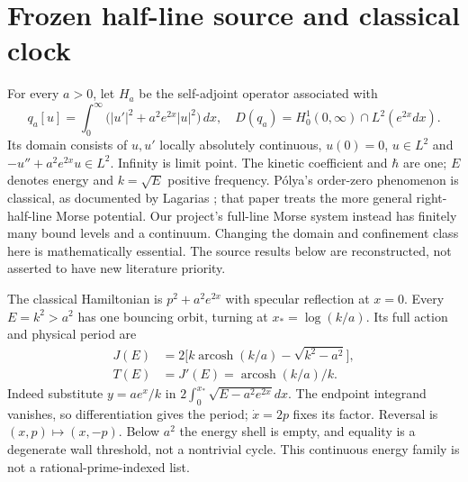 \documentclass[10pt]{article}
\begin{document}
\section{Frozen half-line source and classical clock}
For every $a>0$, let $H_a$ be the self-adjoint operator associated with
\[
 q_a[u]=\int_0^\infty\bigl(|u'|^2+a^2e^{2x}|u|^2\bigr)\,dx,
 \quad D(q_a)=H^1_0(0,\infty)\cap L^2(e^{2x}dx).
\]
Its domain consists of $u,u'$ locally absolutely continuous,
$u(0)=0$, $u\in L^2$ and $-u''+a^2e^{2x}u\in L^2$.
Infinity is limit point. The kinetic coefficient and $\hbar$ are one;
$E$ denotes energy and $k=\sqrt E$ positive frequency.
Pólya's order-zero phenomenon is classical, as documented by Lagarias
\cite{lagarias}; that paper treats the more general right-half-line Morse
potential. Our project's full-line Morse system instead has finitely many
bound levels and a continuum. Changing the domain and confinement class
here is mathematically essential. The source results below are reconstructed,
not asserted to have new literature priority.

The classical Hamiltonian is $p^2+a^2e^{2x}$ with specular reflection at
$x=0$. Every $E=k^2>a^2$ has one bouncing orbit, turning at
$x_* =\log(k/a)$. Its full action and physical period are
\begin{align}
 J(E)&=2\bigl[k\operatorname{arcosh}(k/a)-\sqrt{k^2-a^2}\bigr],\label{action}\\
 T(E)&=J'(E)=\operatorname{arcosh}(k/a)/k.\label{period}
\end{align}
Indeed substitute $y=ae^x/k$ in $2\int_0^{x_*}\sqrt{E-a^2e^{2x}}dx$.
The endpoint integrand vanishes, so differentiation gives the period;
$\dot x=2p$ fixes its factor. Reversal is $(x,p)\mapsto(x,-p)$.
Below $a^2$ the energy shell is empty, and equality is a degenerate wall
threshold, not a nontrivial cycle. This continuous energy family is not
a rational-prime-indexed list.
\end{document}
